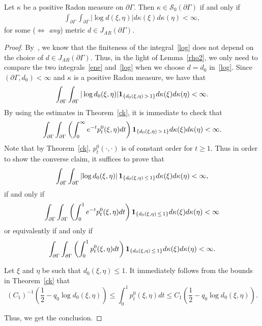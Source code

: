 \documentclass[10pt]{amsart}
\theoremstyle{definition}\newtheorem{defi}[theo]{Definition}\newtheorem{rema}[theo]{Remark}\newtheorem{exam}[theo]{Example}\newtheorem{exem}[theo]{Example}\newtheorem{nota}[theo]{Notation}
\newcommand{\cs}{\mathcal{S}}
\begin{document}
\begin{prop}\label{criterion}
Let $\kappa$ be a positive Radon measure on $\partial\Gamma$. Then $\kappa\in\cs_0(\partial\Gamma)$ if and only if
\begin{align}\label{log}
\int_{\partial\Gamma}\int_{\partial\Gamma}|\log d(\xi,\eta)|d\kappa(\xi)d\kappa(\eta)<\infty,
\end{align}
for some ($\Leftrightarrow$ \emph{any}) metric $d\in J_{AR}(\partial\Gamma)$.
\end{prop}

\begin{proof}
By~\cite[Corollary~11.5]{Hei}, we know that the finiteness of the integral~\eqref{log} does not depend on the choice of
$d\in J_{AR}(\partial\Gamma)$. Thus, in the light of Lemma~\ref{rho2}, we only need to compare the two integrals~\eqref{ene} and~\eqref{log} when we choose $d=d_0$ in~\eqref{log}. Since $(\partial\Gamma,d_0)<\infty$ and $\kappa$ is a positive Radon measure, we have that
\begin{align*}
\int_{\partial\Gamma}\int_{\partial\Gamma}|\log d_0(\xi,\eta)| {\bf 1}_{\left\{d_0(\xi,\eta)\,>\,1\right\}}d\kappa(\xi)d\kappa(\eta)<\infty.
\end{align*}
By using the estimates in Theorem~\ref{ck}, it is immediate to check that
\begin{align*}
\int_{\partial\Gamma}\int_{\partial\Gamma}\left(\int_0^{\infty}e^{-t}p_t^0(\xi,\eta)dt\right){\bf 1}_{\left\{d_0(\xi,\eta)\,>\,1\right\}} d\kappa(\xi)d\kappa(\eta)<\infty.
\end{align*}
Note that by Theorem~\ref{ck}, $p_t^0(\cdot,\cdot)$ is of constant order for $t\geq1$. Thus in order to show the converse claim, it suffices to prove that
\begin{align*}
\int_{\partial\Gamma}\int_{\partial\Gamma}\left|\log d_0(\xi,\eta)\right| {\bf 1}_{\left\{d_0(\xi,\eta)\,\leq\,1\right\}}d\kappa(\xi)d\kappa(\eta)<\infty,
\end{align*}
if and only if
\begin{align*}
\int_{\partial\Gamma}\int_{\partial\Gamma}\left(\int_0^{1}e^{-t}p_t^0(\xi,\eta)dt\right) {\bf 1}_{\left\{d_0(\xi,\eta)\,\leq\,1\right\}}d\kappa(\xi)d\kappa(\eta)<\infty
\end{align*}
or equivalently if and only if
\begin{align*}
\int_{\partial\Gamma}\int_{\partial\Gamma}\left(\int_0^{1}p_t^0(\xi,\eta)dt\right) {\bf 1}_{\left\{d_0(\xi,\eta)\,\leq\,1\right\}}d\kappa(\xi)d\kappa(\eta)<\infty.
\end{align*}

Let $\xi$ and $\eta$ be such that $d_0(\xi,\eta)\leq1$. It immediately follows from the bounds in Theorem~\ref{ck} that
\[
(C_1)^{-1}\left(\frac 12 -q_0\log d_0(\xi,\eta)\right)
\leq \int_0^1 p_t^0(\xi,\eta)dt \leq C_1\left(\frac 12 -q_0\log d_0(\xi,\eta)\right).
\]


Thus, we get the conclusion.
\end{proof}
\end{document}
